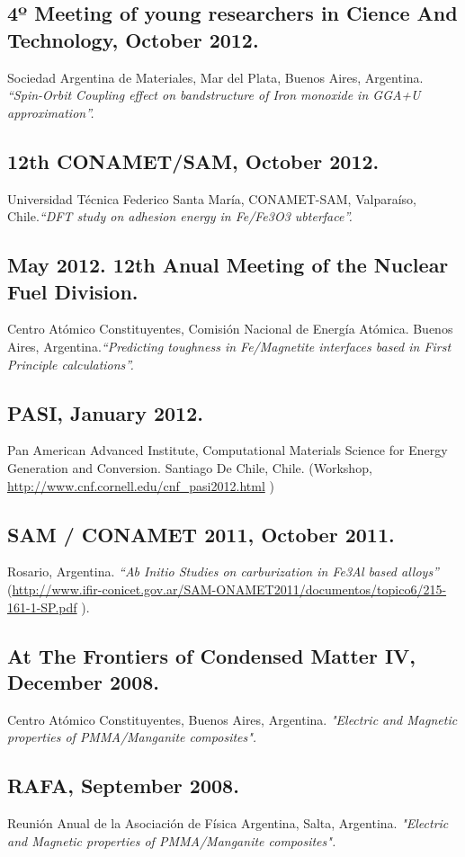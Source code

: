\documentclass{my_cv}
\begin{document}
\subsection{4º Meeting of young researchers in Cience And Technology, October 2012.}Sociedad Argentina de Materiales, Mar del Plata, Buenos Aires, Argentina. \emph{  “Spin-Orbit Coupling effect on bandstructure of Iron monoxide in GGA+U approximation”. }

\subsection{12th CONAMET/SAM, October 2012.}  Universidad Técnica Federico Santa María, CONAMET-SAM, Valparaíso, Chile.\emph{“DFT study on adhesion energy in Fe/Fe3O3 ubterface”.}

\subsection{May 2012. 12th Anual Meeting of the Nuclear Fuel Division.} Centro Atómico Constituyentes, Comisión Nacional de Energía Atómica. Buenos Aires, Argentina.\emph{“Predicting toughness in Fe/Magnetite interfaces based in First Principle calculations”.}

\subsection{PASI, January 2012.} Pan American Advanced Institute, Computational Materials Science for Energy Generation and Conversion. Santiago De Chile, Chile. (Workshop, \url{http://www.cnf.cornell.edu/cnf\_pasi2012.html} ) 

\subsection{SAM / CONAMET 2011, October 2011.}  Rosario, Argentina. \emph{“Ab Initio Studies on carburization in Fe3Al based alloys”} (\url{http://www.ifir-conicet.gov.ar/SAM-ONAMET2011/documentos/topico6/215-161-1-SP.pdf} ). 

\subsection{At The Frontiers of Condensed Matter IV, December 2008.} Centro Atómico Constituyentes, Buenos Aires, Argentina. \emph{"Electric and Magnetic properties of PMMA/Manganite composites". }

\subsection{RAFA, September 2008.} Reunión Anual de la Asociación de Física Argentina, Salta, Argentina. \emph{"Electric and Magnetic properties of PMMA/Manganite composites". }
\end{document}
